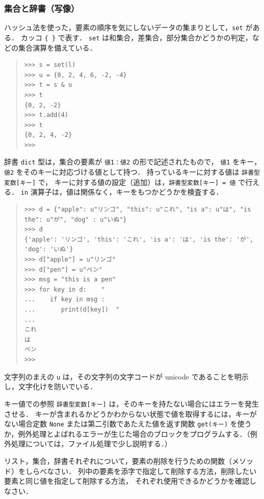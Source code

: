 \documentclass[11pt,a4,epsf]{article}
\begin{document}
\subsubsection{集合と辞書（写像）}

ハッシュ法を使った，要素の順序を気にしないデータの集まりとして，\verb+set+ がある．
カッコ \verb+{ }+ で表す．
\verb+set+ は和集合，差集合，部分集合かどうかの判定，などの集合演算を備えている．
\begin{quote}
\small
\begin{verbatim}
>>> s = set(l)
>>> u = {0, 2, 4, 6, -2, -4}
>>> t = s & u
>>> t
{0, 2, -2}
>>> t.add(4)
>>> t
{0, 2, 4, -2}
>>>
\end{verbatim}
\end{quote}

辞書 \verb+dict+ 型は，集合の要素が \verb+値1：値2+ の形で記述されたもので，
 \verb+値1+ をキー，\verb+値2+ をそのキーに対応づける値として持つ．
持っているキーに対する値は \verb+辞書型変数[キー]+ で，
キーに対する値の設定（追加）は，\verb+辞書型変数[キー] = 値+ で行える．
\verb+in+ 演算子は，値は関係なく，キーをもつかどうかを検査する．
\begin{quote}
\small
\begin{verbatim}
>>> d = {"apple": u"リンゴ", "this": u"これ", "is a": u"は", "is the": u"が", "dog" : u"いぬ"}
>>> d
{'apple': 'リンゴ', 'this': 'これ', 'is a': 'は', 'is the': 'が', 'dog': 'いぬ'}
>>> d["apple"] = u"リンゴ"
>>> d["pen"] = u"ペン"
>>> msg = "this is a pen"
>>> for key in d:    "
...    if key in msg :
...       print(d[key])  "
...
これ
は
ペン
>>>
\end{verbatim}
\end{quote}
文字列のまえの \verb+u+ は，その文字列の文字コードが unicode であることを明示し，文字化けを防いでいる．

キー値での参照 \verb+辞書型変数[キー]+ は，そのキーを持たない場合にはエラーを発生させる．
キーが含まれるかどうかわからない状態で値を取得するには，キーがない場合定数 \verb+None+ または第二引数であたえた値を返す関数 \verb+get(キー)+ を使うか，例外処理とよばれるエラーが生じた場合のブロックをプログラムする．（例外処理については，ファイル処理で少し説明する．）

\begin{excercise}
リスト，集合，辞書それぞれについて，要素の削除を行うための関数（メソッド）をしらべなさい．
列中の要素を添字で指定して削除する方法，削除したい要素と同じ値を指定して削除する方法，
それぞれ使用できるかどうかを確認しなさい．
\end{excercise}
\end{document}

